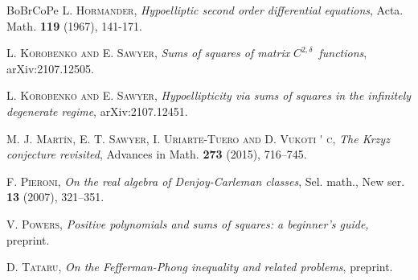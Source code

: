 \documentclass{amsart}
\theoremstyle{plain}
\numberwithin{equation}{section}
\begin{document}
\begin{thebibliography}{BoBrCoPe}
 \textsc{L. Hormander,} \textit{Hypoelliptic second order
differential equations}, Acta. Math\textit{. }\textbf{119} (1967), 141-171.

 \textsc{L. Korobenko and E. Sawyer,} \textit{Sums of
squares of matrix }$C^{2,\delta }$\textit{\ functions}, arXiv:2107.12505.

 \textsc{L. Korobenko and E. Sawyer,} \textit{%
Hypoellipticity via sums of squares in the infinitely degenerate regime},
arXiv:2107.12451.

 \textsc{M. J. Mart\'{\i}n, E. T. Sawyer, I.
Uriarte-Tuero and D. Vukoti%
\'{}%
c}, \textit{The Krzyz conjecture revisited}, Advances in Math. \textbf{273}
(2015), 716--745.

 \textsc{F. Pieroni}, \textit{On the real algebra of
Denjoy-Carleman classes}, Sel. math., New ser. \textbf{13} (2007), 321--351.

 \textsc{V. Powers}, \textit{Positive polynomials and sums
of squares: a beginner's guide, }preprint.

 \textsc{D. Tataru,} \textit{On the Fefferman-Phong
inequality and related problems}, preprint.
\end{thebibliography}
\end{document}
